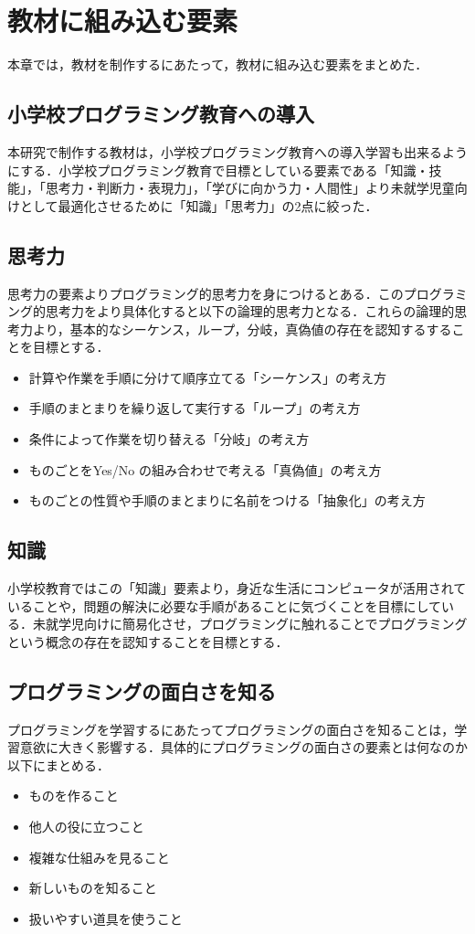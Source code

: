 \newpage

\section{\rm 教材に組み込む要素}
本章では，教材を制作するにあたって，教材に組み込む要素をまとめた．



\subsection{小学校プログラミング教育への導入}
本研究で制作する教材は，小学校プログラミング教育への導入学習も出来るようにする．小学校プログラミング教育で目標としている要素である「知識・技能」，「思考力・判断力・表現力」，「学びに向かう力・人間性」より未就学児童向けとして最適化させるために「知識」「思考力」の2点に絞った．

\subsection{思考力}
思考力の要素よりプログラミング的思考力を身につけるとある．このプログラミング的思考力をより具体化すると以下の論理的思考力となる．これらの論理的思考力より，基本的なシーケンス，ループ，分岐，真偽値の存在を認知するすることを目標とする．
\begin{itemize}
\item 計算や作業を手順に分けて順序立てる「シーケンス」の考え方\\
\item 手順のまとまりを繰り返して実行する「ループ」の考え方\\
\item 条件によって作業を切り替える「分岐」の考え方\\
\item ものごとをYes/No の組み合わせで考える「真偽値」の考え方\\
\item ものごとの性質や手順のまとまりに名前をつける「抽象化」の考え方
\end{itemize}

\subsection{知識}
小学校教育ではこの「知識」要素より，身近な生活にコンピュータが活用されていることや，問題の解決に必要な手順があることに気づくことを目標にしている．未就学児向けに簡易化させ，プログラミングに触れることでプログラミングという概念の存在を認知することを目標とする．

\subsection{プログラミングの面白さを知る}
プログラミングを学習するにあたってプログラミングの面白さを知ることは，学習意欲に大きく影響する．具体的にプログラミングの面白さの要素とは何なのか以下にまとめる．
\begin{itemize}
\item ものを作ること\\
\item 他人の役に立つこと\\
\item 複雑な仕組みを見ること\\
\item 新しいものを知ること\\
\item 扱いやすい道具を使うこと
\end{itemize}
